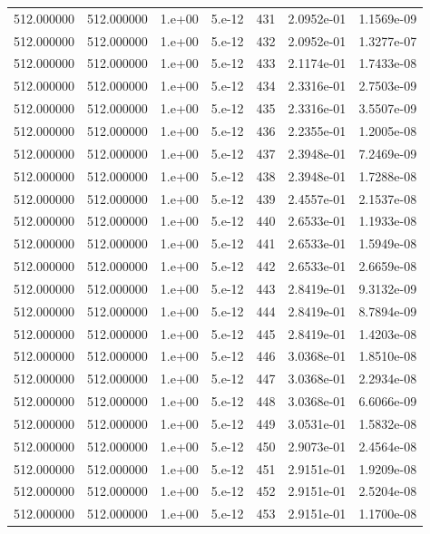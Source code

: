 \begin{table}[htbp]
\begin{tabular}{rrrrrrr}
512.000000 & 512.000000 & 1.e+00 & 5.e-12 & 431 & 2.0952e-01 & 1.1569e-09 \\
512.000000 & 512.000000 & 1.e+00 & 5.e-12 & 432 & 2.0952e-01 & 1.3277e-07 \\
512.000000 & 512.000000 & 1.e+00 & 5.e-12 & 433 & 2.1174e-01 & 1.7433e-08 \\
512.000000 & 512.000000 & 1.e+00 & 5.e-12 & 434 & 2.3316e-01 & 2.7503e-09 \\
512.000000 & 512.000000 & 1.e+00 & 5.e-12 & 435 & 2.3316e-01 & 3.5507e-09 \\
512.000000 & 512.000000 & 1.e+00 & 5.e-12 & 436 & 2.2355e-01 & 1.2005e-08 \\
512.000000 & 512.000000 & 1.e+00 & 5.e-12 & 437 & 2.3948e-01 & 7.2469e-09 \\
512.000000 & 512.000000 & 1.e+00 & 5.e-12 & 438 & 2.3948e-01 & 1.7288e-08 \\
512.000000 & 512.000000 & 1.e+00 & 5.e-12 & 439 & 2.4557e-01 & 2.1537e-08 \\
512.000000 & 512.000000 & 1.e+00 & 5.e-12 & 440 & 2.6533e-01 & 1.1933e-08 \\
512.000000 & 512.000000 & 1.e+00 & 5.e-12 & 441 & 2.6533e-01 & 1.5949e-08 \\
512.000000 & 512.000000 & 1.e+00 & 5.e-12 & 442 & 2.6533e-01 & 2.6659e-08 \\
512.000000 & 512.000000 & 1.e+00 & 5.e-12 & 443 & 2.8419e-01 & 9.3132e-09 \\
512.000000 & 512.000000 & 1.e+00 & 5.e-12 & 444 & 2.8419e-01 & 8.7894e-09 \\
512.000000 & 512.000000 & 1.e+00 & 5.e-12 & 445 & 2.8419e-01 & 1.4203e-08 \\
512.000000 & 512.000000 & 1.e+00 & 5.e-12 & 446 & 3.0368e-01 & 1.8510e-08 \\
512.000000 & 512.000000 & 1.e+00 & 5.e-12 & 447 & 3.0368e-01 & 2.2934e-08 \\
512.000000 & 512.000000 & 1.e+00 & 5.e-12 & 448 & 3.0368e-01 & 6.6066e-09 \\
512.000000 & 512.000000 & 1.e+00 & 5.e-12 & 449 & 3.0531e-01 & 1.5832e-08 \\
512.000000 & 512.000000 & 1.e+00 & 5.e-12 & 450 & 2.9073e-01 & 2.4564e-08 \\
512.000000 & 512.000000 & 1.e+00 & 5.e-12 & 451 & 2.9151e-01 & 1.9209e-08 \\
512.000000 & 512.000000 & 1.e+00 & 5.e-12 & 452 & 2.9151e-01 & 2.5204e-08 \\
512.000000 & 512.000000 & 1.e+00 & 5.e-12 & 453 & 2.9151e-01 & 1.1700e-08 \\

\end{tabular}
\end{table}
